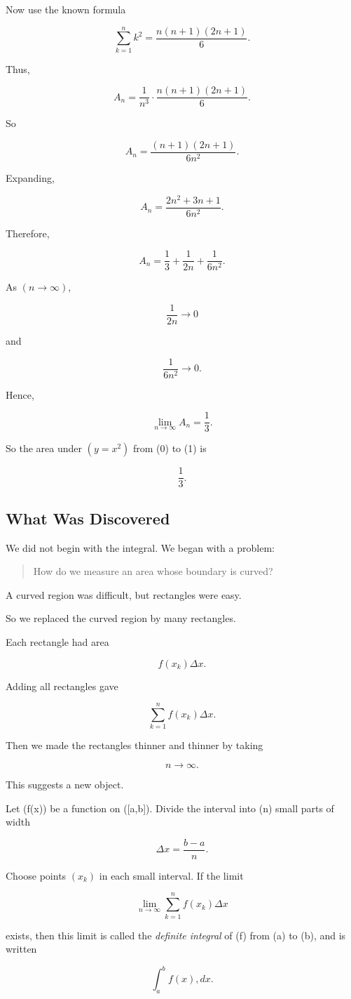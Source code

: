 Now use the known formula

\[
\sum_{k=1}^{n}k^2 = \frac{n(n+1)(2n+1)}{6}.
\]

Thus,

\[
A_n=
\frac{1}{n^3}\cdot
\frac{n(n+1)(2n+1)}{6}.
\]

So

\[
A_n=
\frac{(n+1)(2n+1)}{6n^2}.
\]

Expanding,

\[
A_n=
\frac{2n^2+3n+1}{6n^2}.
\]

Therefore,

\[
A_n=
\frac{1}{3}+\frac{1}{2n}+\frac{1}{6n^2}.
\]

As $(n\to\infty)$,

\[
\frac{1}{2n}\to 0
\]

and

\[
\frac{1}{6n^2}\to 0.
\]

Hence,

\[
\lim_{n\to\infty}A_n = \frac{1}{3}.
\]

So the area under $(y=x^2)$ from (0) to (1) is

\[
\frac{1}{3}.
\]

\subsection{What Was Discovered}

We did not begin with the integral.
We began with a problem:

\begin{quote}
How do we measure an area whose boundary is curved?
\end{quote}

A curved region was difficult, but rectangles were easy.

So we replaced the curved region by many rectangles.

Each rectangle had area

\[
f(x_k)\Delta x.
\]

Adding all rectangles gave

\[
\sum_{k=1}^{n} f(x_k)\Delta x.
\]

Then we made the rectangles thinner and thinner by taking

\[
n\to\infty.
\]

This suggests a new object.

\begin{definition}
Let (f(x)) be a function on ([a,b]). Divide the interval into (n) small parts of width

\[
\Delta x=\frac{b-a}{n}.
\]

Choose points $(x_k)$ in each small interval. If the limit

\[
\lim_{n\to\infty}
\sum_{k=1}^{n} f(x_k)\Delta x
\]

exists, then this limit is called the \emph{definite integral} of (f) from (a) to (b), and is written

\[
\int_a^b f(x),dx.
\]
\end{definition}

